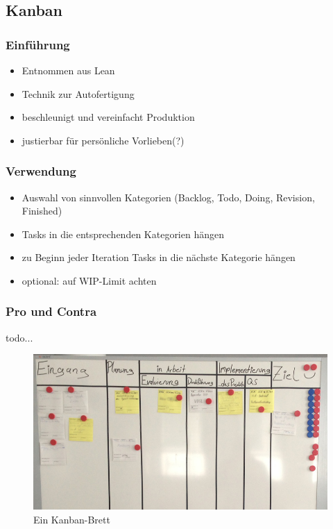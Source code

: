 \documentclass[%
	handout
]{beamer}
\begin{document}
	\subsection{Kanban}
		\begin{frame}
			\frametitle{Einführung}
			\begin{itemize}
				\item Entnommen aus Lean
				\item Technik zur Autofertigung
				\item beschleunigt und vereinfacht Produktion
				\item justierbar für persönliche Vorlieben(?)
			\end{itemize}
		\end{frame}
		
		\begin{frame}
			\frametitle{Verwendung}
			\begin{itemize}
				\item Auswahl von sinnvollen Kategorien (Backlog, Todo, Doing, Revision, Finished)
				\item Tasks in die entsprechenden Kategorien hängen
				\item zu Beginn jeder Iteration Tasks in die nächste Kategorie hängen
				\item optional: auf WIP-Limit achten
			\end{itemize}
		\end{frame}
		
		\begin{frame}
			\frametitle{Pro und Contra}
			todo...
		\end{frame}
		
		\begin{frame}
			\begin{figure}[h]
				\begin{center}
					\includegraphics[scale=.3]{../images/kanban-board.jpg}
					\caption{Ein Kanban-Brett}
					\label{img:kanban}
				\end{center}
			\end{figure}
		\end{frame}
		
\end{document}
